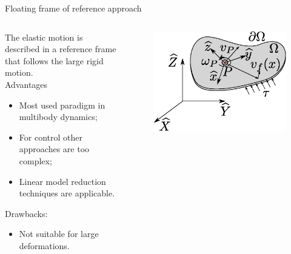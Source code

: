 \documentclass[aspectratio=169]{ISAE-Beamer}
\begin{document}
\begin{frame}{Floating frame of reference approach}
\begin{columns}
\begin{column}{.5\textwidth}
The elastic motion is described in a reference frame that follows the large rigid motion. \\

Advantages 
\begin{itemize}
	\item {Most used paradigm in multibody dynamics;}
	\item {For control other approaches are too complex;}
	\item {Linear model reduction techniques are applicable.} 
\end{itemize}
Drawbacks:
\begin{itemize}
	\item {Not suitable for large deformations.}
\end{itemize}	
\end{column}
\begin{column}{.5\textwidth}
\begin{tcolorbox}
	\begin{figure}[t]
		\centering
		\includegraphics[width=1\textwidth]{presentation/floating_body_small.eps} 
	\end{figure}
\end{tcolorbox}
\end{column}
\end{columns}

\end{frame}
\end{document}
